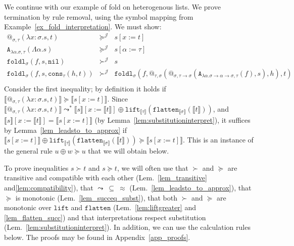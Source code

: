 \documentclass[a4paper,UKenglish,cleveref,autoref,numberwithinsect]{lipics-v2019}
\theoremstyle{definition}
\newcommand{\arrtype}{\rightarrow}
\newcommand{\abs}[2]{\lambda #1.#2}
\newcommand{\tabs}[2]{\Lambda #1.#2}
\newcommand{\arrW}{\leadsto}
\newcommand{\flatten}{\mathtt{flatten}}
\newcommand{\lift}{\mathtt{lift}}
\newcommand{\typeinterpret}[1]{\llbracket #1 \rrbracket}
\newcommand{\interpret}[1]{\llbracket #1 \rrbracket}
\newcommand{\Termmap}{\mathcal{J}}
\newcommand{\succinterpret}{\succ^{\Termmap}}
\newcommand{\succeqinterpret}{\succeq^{\Termmap}}
\newcommand{\nil}{\mathtt{nil}}
\newcommand{\cons}{\mathtt{cons}}
\begin{document}
\begin{example}\label{ex_fold_intermediate}
  We continue with our example of fold on heterogenous lists. We prove
  termination by rule removal, using the symbol mapping from
  Example~\ref{ex_fold_interpretation}.
  We must show:
  \[
  \begin{array}{rcl}
    @_{\sigma,\tau}(\abs{x:\sigma}{s},t) & \succeqinterpret & s[x:=t] \\
    \mathtt{A}_{\abs{\alpha}{\sigma},\tau}(\tabs{\alpha}{s}) &
      \succeqinterpret & s[\alpha:=\tau] \\
    \mathtt{foldl}_\sigma(f,s,\nil) & \succinterpret & s \\
    \mathtt{foldl}_\sigma(f,s,\cons_\tau(h,t)) & \succinterpret &
    \mathtt{foldl}_\sigma(f,@_{\tau,\sigma}(@_{\sigma,\tau
    \arrtype\sigma}(
      \mathtt{A}_{\abs{\alpha}{\sigma\arrtype\alpha\arrtype\sigma},
      \tau}(f),s),h),t) \\
  \end{array}
  \]
Consider the first inequality; by definition it holds if
$\interpret{@_{\sigma,\tau}(\abs{x:\sigma}{s},t)} \succeq
\interpret{s[x:=t]}$.
Since $\interpret{@_{\sigma,\tau}(\abs{x:
\sigma}{s},t)} \arrW^* \interpret{s}[x:=\interpret{t}] \oplus
\lift_{\typeinterpret{\tau}}(\flatten_{\typeinterpret{\sigma}}(
\interpret{t}))$, and $\interpret{s}[x:=\interpret{t}] =
\interpret{s[x:=t]}$ (by Lemma~\ref{lem:substitutioninterpret}),
it suffices by Lemma~\ref{lem_leadsto_to_approx} if
$\interpret{s[x:=t]} \oplus \lift_{\typeinterpret{\tau}}(\flatten_{\typeinterpret{\sigma}}(
\interpret{t})) \succeq \interpret{s[x:=t]}$.
This is an instance of the general rule $u \oplus w \succeq u$ that
we will obtain below.
\end{example}

To prove inequalities $s \succ t$ and $s \succeq t$, we will often
use that $\succ$ and $\succeq$ are transitive and compatible with each
other (Lem.~\ref{lem_transitive} and\ref{lem:compatibility}), that
$\arrW\:\subseteq\:\approx$ (Lem.~\ref{lem_leadsto_to_approx}),
that $\succeq$ is monotonic (Lem.~\ref{lem_succeq_subst}),
that both $\succ$ and $\succeq$ are monotonic over $\lift$ and $\flatten$
(Lem.~\ref{lem:liftgreater} and \ref{lem_flatten_succ}) and that
interpretations respect substitution
(Lem.~\ref{lem:substitutioninterpret}).  In addition, we can use the
calculation rules below. The proofs may be found in
Appendix~\ref{app_proofs}.
\end{document}
